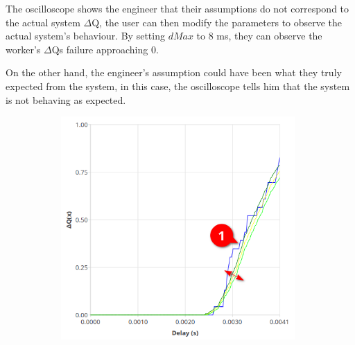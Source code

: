     The oscilloscope shows the engineer that their assumptions do not correspond to the actual system $\Delta$Q, the user can then modify the parameters to observe the actual system's behaviour. By setting $dMax$ to 8 ms, they can observe the worker's $\Delta$Qs failure approaching 0.

    On the other hand, the engineer's assumption could have been what they truly expected from the system, in this case, the oscilloscope tells him that the system is not behaving as expected. 
\begin{figure}[H]
            \centering
            \begin{subfigure}{.5\textwidth}
                \centering
                \includegraphics[width=0.98\textwidth]{img/overload_2/worker_1a.png}
                \label{fig:w14}
            \end{subfigure}%
            \begin{subfigure}{.5\textwidth}
                \centering

\end{subfigure}
\end{figure}
